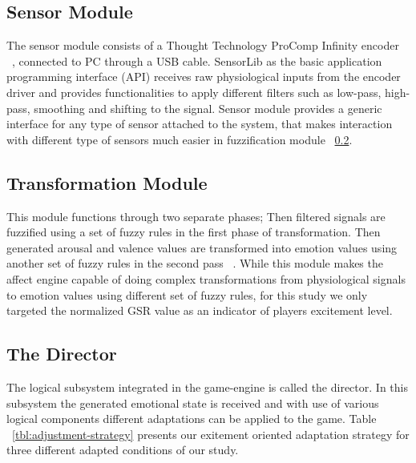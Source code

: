 \documentclass[conference]{IEEEtran}
\begin{document}
\subsection{Sensor Module} \label{subsec:sens-mdl}
The sensor module consists of a Thought Technology ProComp Infinity encoder ~\cite{tt2013procomp}, connected to PC through a USB cable. SensorLib as the basic application programming interface (API) receives raw physiological inputs from the encoder driver and provides functionalities to apply different filters such as low-pass, high-pass, smoothing and shifting to the signal. Sensor module provides a generic interface for any type of sensor attached to the system, that makes interaction with different type of sensors much easier in fuzzification module ~\ref{subsec:fuzzi}.

\subsection{Transformation Module} \label{subsec:fuzzi}
This module functions through two separate phases; Then filtered signals are fuzzified using a set of fuzzy rules in the first phase of transformation. Then generated arousal and valence values are transformed into emotion values using another set of fuzzy rules in the second pass ~\cite{mandryk2007fuzzy}. While this module makes the affect engine capable of doing complex transformations from physiological signals to emotion values using different set of fuzzy rules, for this study we only targeted the normalized GSR value as an indicator of players excitement level.

\subsection{The Director} \label{subsec:director}
The logical subsystem integrated in the game-engine is called the director. In this subsystem the generated emotional state is received and with use of various logical components different adaptations can be applied to the game. Table ~\ref{tbl:adjustment-strategy} presents our exitement oriented adaptation strategy for three different adapted conditions of our study.
\end{document}
